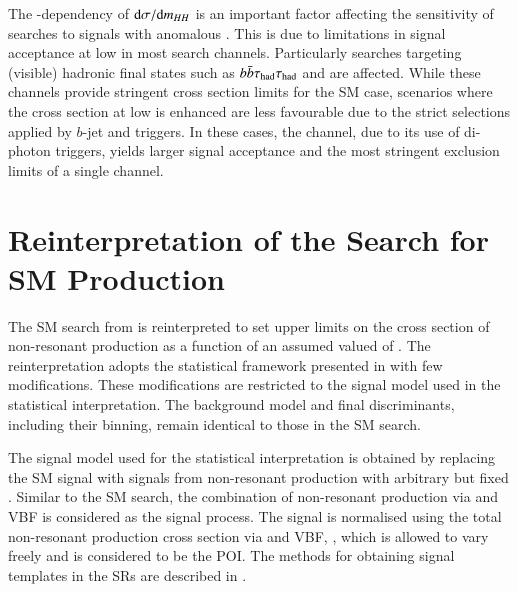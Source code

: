 The \klambda-dependency of $\mathrm{d}\sigma / \mathrm{d}m_{HH}$ is an important
factor affecting the sensitivity of searches to signals with anomalous
\klambda. This is due to limitations in signal acceptance at low \mHH in most
search channels.
Particularly searches targeting (visible) hadronic final states such as
$b\bar{b}\tau_{\text{had}}\tau_{\text{had}}$ and \bbbb are affected. While these channels provide stringent
cross section limits for the SM case, scenarios where the cross section at low
\mHH is enhanced are less favourable due to the strict selections applied by
$b$-jet and \tauhadvis triggers. In these cases, the \bbyy channel, due to its
use of di-photon triggers, yields larger signal acceptance and the most
stringent exclusion limits of a single channel.


\section{Reinterpretation of the Search for SM \HH Production}%
\label{sec:reinterpretation}

The SM \HH search from  is reinterpreted to set
upper limits on the cross section of non-resonant \HH production as a
function of an assumed valued of \klambda. %
The reinterpretation adopts the statistical framework presented in
 with few modifications. These
modifications are restricted to the signal model used in the
statistical interpretation. The background model and final
discriminants, including their binning, remain identical to those in
the SM \HH search.

The signal model used for the statistical interpretation is obtained by
replacing the SM \HH signal with signals from non-resonant \HH production with
arbitrary but fixed \klambda. Similar to the SM \HH search, the combination of
non-resonant \HH production via \ggF and VBF is considered as the signal
process. The signal is normalised using the total non-resonant \HH production
cross section via \ggF and VBF, \xsecggfvbf, which is allowed to vary freely and
is considered to be the POI.
The methods for obtaining signal templates in the SRs are described in
.


